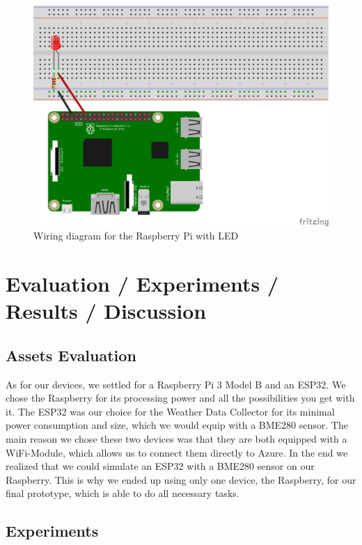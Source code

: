 \documentclass[a4paper]{article}
\begin{document}
			\begin{figure}[!htb]
				\centering
				\includegraphics[width=.8\textwidth]{img/raspberry_led_wiring.png}
				\caption{Wiring diagram for the Raspberry Pi with LED}
				\label{fig:wiringled}
			\end{figure}
			
			
		
	\newpage
	\section{Evaluation / Experiments / Results / Discussion}
	
		\subsection{Assets Evaluation}
		
		As for our devices, we settled for a Raspberry Pi 3 Model B and an ESP32. 
		We chose the Raspberry for its processing power and all the possibilities you get with it. 
		The ESP32 was our choice for the Weather Data Collector for its minimal power consumption and size, which we would equip with a BME280 sensor. 
		The main reason we chose these two devices was that they are both equipped with a WiFi-Module, which allows us to connect them directly to Azure. 
		In the end we realized that we could simulate an ESP32 with a BME280 sensor on our Raspberry. 
		This is why we ended up using only one device, the Raspberry, for our final prototype, which is able to do all necessary tasks.
		
		\subsection{Experiments}
		
\end{document}
